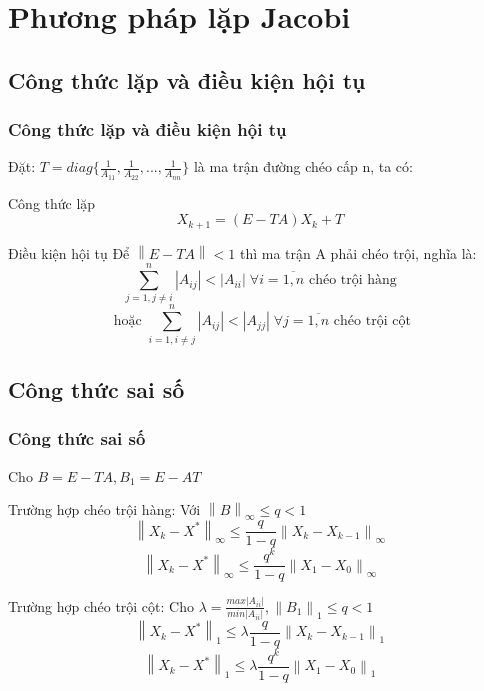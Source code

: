 \section{Phương pháp lặp Jacobi}
\subsection{Công thức lặp và điều kiện hội tụ }
    \begin{frame}
        \frametitle{Công thức lặp và điều kiện hội tụ}

        Đặt: $ T = diag\{\frac{1}{A_{11}}, \frac{1}{A_{22}},..., \frac{1}{A_{nn}}\} $ là ma trận đường chéo cấp n, ta có:
    
        \begin{block}{Công thức lặp}
            $$ X_{k+1} = (E - TA)X_{k} + T $$
        \end{block}
        
        \begin{block}{Điều kiện hội tụ}
            Để $ \left\lVert E - TA \right\rVert < 1 $ thì ma trận A phải chéo trội, nghĩa là:
            $$\sum\limits_{j = 1, j \neq i}^{n} \left\lvert A_{ij} \right\rvert < \left\lvert A_{ii}\right\rvert \; \forall i = \overline{1,n} \text{ chéo trội hàng} $$
            $$\text{ hoặc }  \sum\limits_{i = 1, i \neq j}^{n} \left\lvert A_{ij} \right\rvert < \left\lvert A_{jj}\right\rvert \; \forall j = \overline{1,n} \text{ chéo trội cột}$$
        \end{block}
    \end{frame}

\subsection{Công thức sai số}
    \begin{frame}
        \frametitle{Công thức sai số}
        
        Cho $B = E - TA, B_{1} = E - AT$
        \begin{block}{Trường hợp chéo trội hàng: Với $\left\lVert B\right\rVert _{\infty} \leq q < 1$}
            $$ \left\lVert X_{k} - X^{*} \right\rVert_{\infty} \leq \frac{q}{1 - q} \left\lVert X_{k} - X_{k - 1} \right\rVert_{\infty}  $$
            $$ \left\lVert X_{k} - X^{*} \right\rVert_{\infty} \leq \frac{q^{k}}{1 - q} \left\lVert X_{1} - X_{0} \right\rVert_{\infty}  $$
        \end{block}
        \begin{block}{Trường hợp chéo trội cột: Cho $\lambda = \frac{max \left\lvert A_{ii}\right\rvert }{min \left\lvert A_{ii}\right\rvert }, \left\lVert B_{1}\right\rVert _{1} \leq q < 1 $}
            $$ \left\lVert X_{k} - X^{*} \right\rVert_{1} \leq \lambda \frac{q}{1 - q} \left\lVert X_{k} - X_{k - 1} \right\rVert_{1}  $$
            $$ \left\lVert X_{k} - X^{*} \right\rVert_{1} \leq \lambda \frac{q^{k}}{1 - q} \left\lVert X_{1} - X_{0} \right\rVert_{1}  $$
        \end{block}
    \end{frame}

